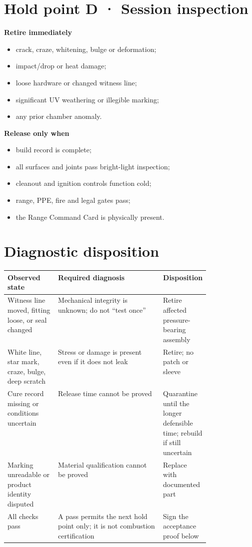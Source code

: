 \section{Hold point D · Session inspection}
\begin{multicols}{2}
\textbf{Retire immediately}
\begin{itemize}
\item crack, craze, whitening, bulge or deformation;
\item impact/drop or heat damage;
\item loose hardware or changed witness line;
\item significant UV weathering or illegible marking;
\item any prior chamber anomaly.
\end{itemize}
\columnbreak
\textbf{Release only when}
\begin{itemize}
\item build record is complete;
\item all surfaces and joints pass bright-light inspection;
\item cleanout and ignition controls function cold;
\item range, PPE, fire and legal gates pass;
\item the Range Command Card is physically present.
\end{itemize}
\end{multicols}

\section{Diagnostic disposition}
\begin{tabularx}{\linewidth}{@{}p{0.25\linewidth}L p{0.22\linewidth}@{}}
\toprule \textbf{Observed state} & \textbf{Required diagnosis} &
\textbf{Disposition}\\ \midrule
Witness line moved, fitting loose, or seal changed & Mechanical integrity is
unknown; do not ``test once'' & Retire affected pressure-bearing assembly\\
White line, star mark, craze, bulge, deep scratch & Stress or damage is present
even if it does not leak & Retire; no patch or sleeve\\
Cure record missing or conditions uncertain & Release time cannot be proved &
Quarantine until the longer defensible time; rebuild if still uncertain\\
Marking unreadable or product identity disputed & Material qualification cannot
be proved & Replace with documented part\\
All checks pass & A pass permits the next hold point only; it is not combustion
certification & Sign the acceptance proof below\\
\bottomrule
\end{tabularx}

